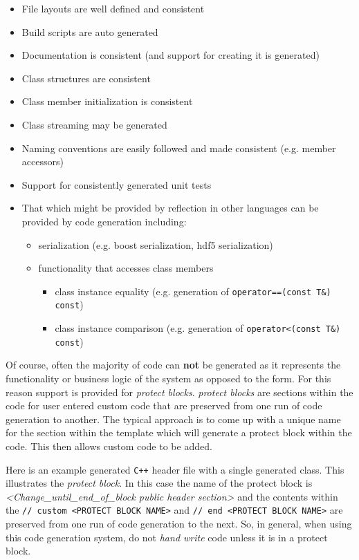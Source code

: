 \documentclass[11pt]{article}
\begin{document}
\begin{itemize}
\item File layouts are well defined and consistent
\item Build scripts are auto generated
\item Documentation is consistent (and support for creating it is generated)
\item Class structures are consistent
\item Class member initialization is consistent
\item Class streaming may be generated
\item Naming conventions are easily followed and made consistent
    (e.g. member accessors)
\item Support for consistently generated unit tests
\item That which might be provided by reflection in other languages can
    be provided by code generation including:

\begin{itemize}
\item serialization (e.g. boost serialization, hdf5 serialization)
\item functionality that accesses class members

\begin{itemize}
\item class instance equality (e.g. generation of \texttt{operator==(const         T\&) const})
\item class instance comparison (e.g. generation of \texttt{operator<(const         T\&) const})
\end{itemize}

\end{itemize}

\end{itemize}
  Of course, often the majority of code can \textbf{not} be generated as it
  represents the functionality or business logic of the system as
  opposed to the form. For this reason support is provided for
  \emph{protect blocks}. \emph{protect blocks} are sections within the code for
  user entered custom code that are preserved from one run of code
  generation to another. The typical approach is to come up with a
  unique name for the section within the template which will generate
  a protect block within the code. This then allows custom code to be
  added.

  Here is an example generated \texttt{C++} header file with a single
  generated class. This illustrates the \emph{protect block}. In this case
  the name of the protect block is \emph{<Change\_{}until\_{}end\_{}of\_{}block public   header section>} and the contents within the \texttt{// custom <PROTECT   BLOCK NAME>} and \texttt{// end <PROTECT BLOCK NAME>} are preserved from
  one run of code generation to the next. So, in general, when using
  this code generation system, do not \emph{hand write} code unless it is
  in a protect block.
\pagebreak
\end{document}
